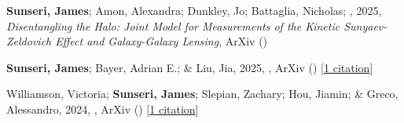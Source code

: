\item \textbf{Sunseri, James}; Amon, Alexandra; Dunkley, Jo; Battaglia, Nicholas; \etal, 2025, \emph{Disentangling the Halo: Joint Model for Measurements of the Kinetic Sunyaev-Zeldovich Effect and Galaxy-Galaxy Lensing}, ArXiv ()

\item \textbf{Sunseri, James}; Bayer, Adrian E.; \& Liu, Jia, 2025, , ArXiv () [\href{https://ui.adsabs.harvard.edu/abs/2025arXiv250311778S}{1 citation}]

\item Williamson, Victoria; \textbf{Sunseri, James}; Slepian, Zachary; Hou, Jiamin; \& Greco, Alessandro, 2024, , ArXiv () [\href{https://ui.adsabs.harvard.edu/abs/2024arXiv241203967W}{1 citation}]